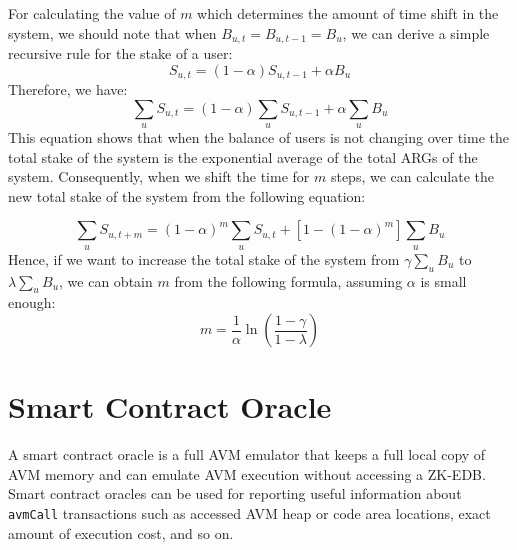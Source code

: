 \documentclass[11pt, A4]{report}
\begin{document}
    For calculating the value of \(m\) which determines the amount of time shift in the system, we should note that when
    \(B_{u,t} = B_{u, t-1} = B_u\), we can derive a simple recursive rule for the stake of a user:
    \[
        S_{u,t} = (1 - \alpha) S_{u,t-1} + \alpha B_u
    \]
    Therefore, we have:
    \[
        \sum_{u}S_{u,t} = (1 - \alpha) \sum_{u}S_{u,t - 1} + \alpha \sum_{u}B_u
    \]
    This equation shows that when the balance of users is not changing over time the total stake of the system is the
    exponential average of the total ARGs of the system. Consequently, when we shift the time for \(m\) steps, we can
    calculate the new total stake of the system from the following equation:

    \[
        \sum_{u}S_{u,t+m} = (1 - \alpha)^{m}\sum_{u}S_{u,t} + [1 - (1 - \alpha)^{m}]\sum_{u}B_u
    \]
    Hence, if we want to increase the total stake of the system from \(\gamma \sum_{u}B_u\) to \(\lambda \sum_{u}B_u\),
    we can obtain \(m\) from the following formula, assuming \(\alpha\) is small enough:
    \[
        m = \frac{1}{\alpha} \ln \left(\frac{1 - \gamma}{1 - \lambda}\right)
    \]


    \section{Smart Contract Oracle}\label{sec:smart-contract-oracle}

    A smart contract oracle is a full AVM emulator that keeps a full local copy of AVM memory and can emulate AVM
    execution without accessing a ZK-EDB. Smart contract oracles can be used for reporting useful information about
    \texttt{avmCall} transactions such as accessed AVM heap or code area locations, exact amount of execution cost,
    and so on.
\end{document}
